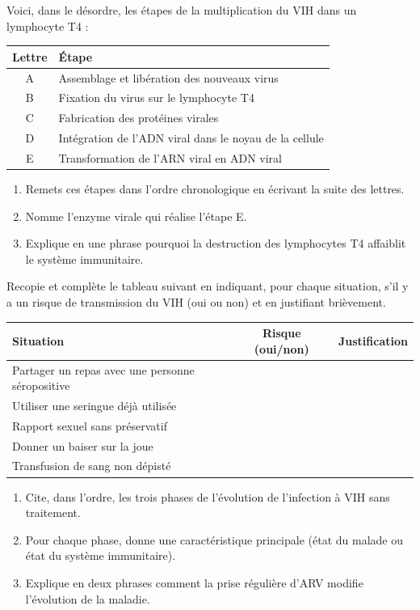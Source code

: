 \documentclass[11pt]{article}
\begin{document}
\begin{exercice}
Voici, dans le désordre, les étapes de la multiplication du VIH dans un lymphocyte T4 :
\begin{center}
\begin{tabular}{|c|l|}
\hline
Lettre & Étape \\
\hline
A & Assemblage et libération des nouveaux virus \\
B & Fixation du virus sur le lymphocyte T4 \\
C & Fabrication des protéines virales \\
D & Intégration de l'ADN viral dans le noyau de la cellule \\
E & Transformation de l'ARN viral en ADN viral \\
\hline
\end{tabular}
\end{center}
\begin{enumerate}
  \item Remets ces étapes dans l'ordre chronologique en écrivant la suite des lettres.
  \item Nomme l'enzyme virale qui réalise l'étape E.
  \item Explique en une phrase pourquoi la destruction des lymphocytes T4 affaiblit le système immunitaire.
\end{enumerate}
\end{exercice}

\begin{exercice}
Recopie et complète le tableau suivant en indiquant, pour chaque situation, s'il y a un risque de transmission du VIH (oui ou non) et en justifiant brièvement.
\begin{center}
\begin{tabular}{|p{5.5cm}|c|p{5cm}|}
\hline
Situation & Risque (oui/non) & Justification \\
\hline
Partager un repas avec une personne séropositive & & \\
\hline
Utiliser une seringue déjà utilisée & & \\
\hline
Rapport sexuel sans préservatif & & \\
\hline
Donner un baiser sur la joue & & \\
\hline
Transfusion de sang non dépisté & & \\
\hline
\end{tabular}
\end{center}
\end{exercice}

\begin{exercice}
\begin{enumerate}
  \item Cite, dans l'ordre, les trois phases de l'évolution de l'infection à VIH sans traitement.
  \item Pour chaque phase, donne une caractéristique principale (état du malade ou état du système immunitaire).
  \item Explique en deux phrases comment la prise régulière d'ARV modifie l'évolution de la maladie.
\end{enumerate}
\end{exercice}
\end{document}
